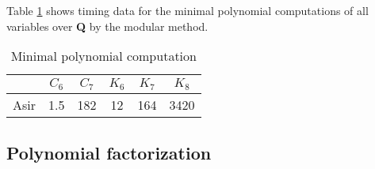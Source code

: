 \documentclass[runningheads]{cl2emult}
\begin{document}
Table \ref{minipoly} shows timing data for the minimal polynomial
computations of all variables over {\bf Q} by the modular method.
\begin{table}[hbtp]
\begin{center}
\begin{tabular}{|c||c|c|c|c|c|} \hline
		& $C_6$ & $C_7$ & $K_6$ & $K_7$ & $K_8$ \\ \hline
Asir & 1.5 & 182 & 12 & 164 & 3420  \\ \hline
\end{tabular}
\end{center}
\caption{Minimal polynomial computation}
\label{minipoly}
\end{table}

\subsection{Polynomial factorization}

%
\end{document}
